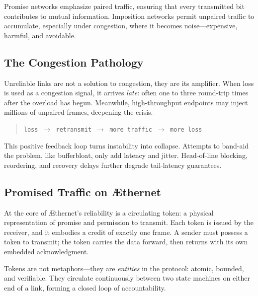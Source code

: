 \documentclass[../OAE-SPEC-MAIN.tex]{subfiles}
\begin{document}
Promise networks emphasize paired traffic, ensuring that every transmitted bit contributes to mutual information. Imposition networks permit unpaired traffic to accumulate, especially under congestion, where it becomes noise—expensive, harmful, and avoidable.

\subsection*{The Congestion Pathology}

Unreliable links are not a solution to congestion, they are its amplifier. When loss is used as a congestion signal, it arrives \emph{late}: often one to three round-trip times after the overload has begun. Meanwhile, high-throughput endpoints may inject millions of unpaired frames, deepening the crisis.

\begin{quote}
\centering
\texttt{loss $\rightarrow$ retransmit $\rightarrow$ more traffic $\rightarrow$ more loss}
\end{quote}

This positive feedback loop turns instability into collapse. Attempts to band-aid the problem, like bufferbloat, only add latency and jitter. Head-of-line blocking, reordering, and recovery delays further degrade tail-latency guarantees.

\subsection*{Promised Traffic on \AE thernet}

At the core of \AE thernet’s reliability is a circulating token: a physical representation of promise and permission to transmit. Each token is issued by the receiver, and it embodies a credit of exactly one frame. A sender must possess a token to transmit; the token carries the data forward, then returns with its own embedded acknowledgment.

Tokens are not metaphors—they are \emph{entities} in the protocol: atomic, bounded, and verifiable. They circulate continuously between two state machines on either end of a link, forming a closed loop of accountability.
\end{document}
